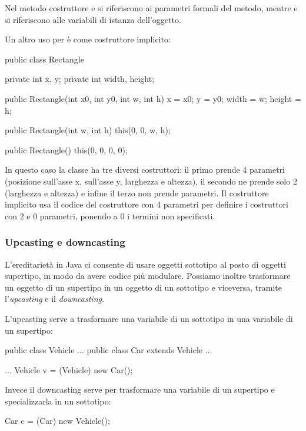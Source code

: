 Nel metodo costruttore  e  si riferiscono ai parametri formali del metodo, mentre  e  si riferiscono alle variabili di istanza dell'oggetto.

Un altro uso per  è come costruttore implicito:
\begin{Java}
    public class Rectangle{
        private int x, y;
        private int width, height;

        public Rectangle(int x0, int y0, int w, int h){
            x = x0;
            y = y0;
            width = w;
            height = h;
        }

        public Rectangle(int w, int h){
            this(0, 0, w, h);
        }

        public Rectangle(){
            this(0, 0, 0, 0);
        }
    }
\end{Java}

In questo caso la classe  ha tre diversi costruttori: il primo prende 4 parametri (posizione sull'asse x, sull'asse y, larghezza e altezza), il secondo ne prende solo 2 (larghezza e altezza) e infine il terzo non prende parametri. Il costruttore implicito  usa il codice del costruttore con 4 parametri per definire i costruttori con 2 e 0 parametri, ponendo a $0$ i termini non specificati.

\subsubsection{Upcasting e downcasting}

L'ereditarietà in Java ci consente di usare oggetti sottotipo al posto di oggetti supertipo, in modo da avere codice più modulare. Possiamo inoltre trasformare un oggetto di un supertipo in un oggetto di un sottotipo e viceversa, tramite l'\emph{upcasting} e il \emph{downcasting}.

L'upcasting serve a trasformare una variabile di un sottotipo in una variabile di un supertipo: 
\begin{Java}
    public class Vehicle {...}
    public class Car extends Vehicle {...}

    ...
    Vehicle v = (Vehicle) new Car();
\end{Java}
Invece il downcasting serve per trasformare una variabile di un supertipo e specializzarla in un sottotipo:
\begin{Java}
    Car c = (Car) new Vehicle();
\end{Java}

